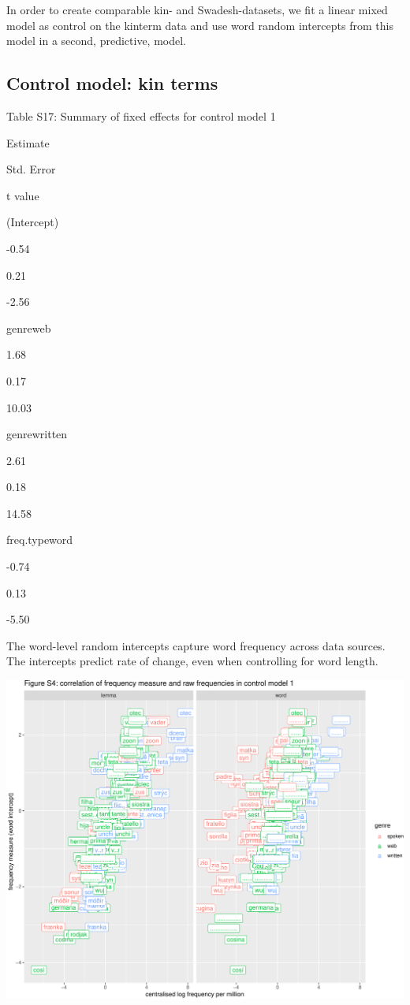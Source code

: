 \documentclass[]{article}
\begin{document}
In order to create comparable kin- and Swadesh-datasets, we fit a linear
mixed model as control on the kinterm data and use word random
intercepts from this model in a second, predictive, model.

\subsection{Control model: kin terms}\label{control-model-kin-terms}

Table S17: Summary of fixed effects for control model 1

Estimate

Std. Error

t value

(Intercept)

-0.54

0.21

-2.56

genreweb

1.68

0.17

10.03

genrewritten

2.61

0.18

14.58

freq.typeword

-0.74

0.13

-5.50

The word-level random intercepts capture word frequency across data
sources. The intercepts predict rate of change, even when controlling
for word length.

\includegraphics{figures/unnamed-chunk-10-1.pdf}
\end{document}
